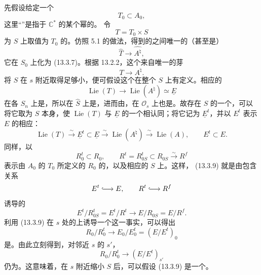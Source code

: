 先假设给定一个
\begin{equation}
 T_0\subset A_0,
 \tag{13.3.7}
\end{equation}
这里“”是指于 $\mathbb C^*$ 的某个幂的。
令
\begin{equation}
 T=T_0\times S
 \tag{13.3.8}
\end{equation}
为 $S$ 上取值为 $T_0$ 的。仿照 5.1 的做法，得到的之间唯一的（甚至是）
\[
 \widehat T\longrightarrow\widehat{A^\natural},
\]
它在 $S_0$ 上化为 (13.3.7)。根据 13.2.2，这个来自唯一的芽
\begin{equation}
 T\longrightarrow A^\natural.
 \tag{13.3.9}
\end{equation}
将 $S$ 在 $s$ 附近取得足够小，便可假设这个在整个 $S$ 上有定义。相应的
\[
 \operatorname{Lie}(T)\longrightarrow\operatorname{Lie}(A^\natural)\simeq\underline E
\]
在各 $S_n$ 上是，所以在 $\widehat S$ 上是，进而由，在 $\mathcal O_s$ 上也是。故存在 $S$ 的一个，可以将它取为 $S$ 本身，使 $\operatorname{Lie}(T)$ 与 $\underline E$ 的一个相认同；将它记为 $\underline E^t$，并以 $E^t$ 表示 $E$ 的相应：
\begin{equation}
 \operatorname{Lie}(T)\xrightarrow{\sim}\underline E^t\subset\underline E
 \xrightarrow{\sim}\operatorname{Lie}(A^\natural)
 \xrightarrow{\sim}\operatorname{Lie}(A),\qquad E^t\subset E.
 \tag{13.3.10}
\end{equation}
同样，以
\begin{equation}
 R_0^t\subset R_0,
 \qquad R^t=R_{0S}^t\subset R_{0S}\xrightarrow{\sim}R^f
 \tag{13.3.11}
\end{equation}
表示由 $A_0$ 的 $T_0$ 所定义的 $R_0$ 的，以及相应的 $S$ 上。这样， (13.3.9)
就是由包含关系
\[
 E^t\lhook\joinrel\longrightarrow E,\qquad
 R^t\lhook\joinrel\longrightarrow R^f
\]
诱导的
\[
 E^t/R^t_{0S}=E^t/R^t\longrightarrow E/R_{0S}=E/R^f.
\]
利用 (13.3.9) 在 $s$ 处的上诱导一个这一事实，可以得出
\[
 R_0/R_0^t\longrightarrow E_0/E_0^t=(E/E^t)_0
\]
是。由此立刻得到，对邻近 $s$ 的 $s'$，
\[
 R_0/R_0^t\longrightarrow(E/E^t)_{s'}
\]
仍为。这意味着，在 $s$ 附近缩小 $S$ 后，可以假设 (13.3.9) 是一个。

